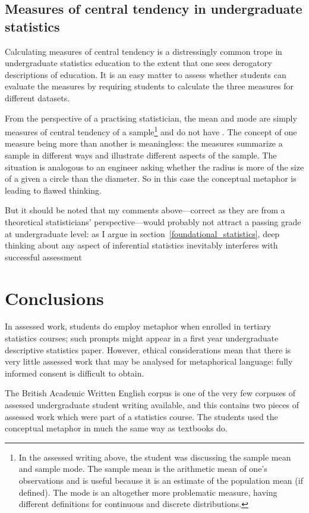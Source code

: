\subsection{Measures of central tendency in undergraduate statistics}

Calculating measures of central tendency is a distressingly common
trope in undergraduate statistics education to the extent that one
sees derogatory descriptions of  education.
It is an easy matter to assess whether students can evaluate the
measures by requiring students to calculate the three measures for
different datasets.

From the perspective of a practising statistician, the mean and mode
are simply measures of central tendency of a sample\footnote{In the
  assessed writing above, the student was discussing the sample mean
  and sample mode.  The sample mean is the arithmetic mean of one's
  observations and is useful because it is an estimate of the
  population mean (if defined).  The mode is an altogether more
  problematic measure, having different definitions for continuous and
  discrete distributions.} and do not have .  The
concept of one measure being more  than
another is meaningless: the measures summarize a sample in different
ways and illustrate different aspects of the sample.  The situation is
analogous to an engineer asking whether the radius is more
 of the size of a given a circle than the
diameter.  So in this case the conceptual metaphor  is leading to flawed thinking.

But it should be noted that my comments above---correct as they are
from a theoretical statisticians' perspective---would probably not
attract a passing grade at undergraduate level: as I argue in
section~\ref{foundational_statistics}, deep thinking about any aspect
of inferential statistics inevitably interferes with successful
assessment

\section{Conclusions}

In assessed work, students do employ metaphor when enrolled in
tertiary statistics courses; such prompts might appear in a first year
undergraduate descriptive statistics paper.  However, ethical
considerations mean that there is very little assessed work that may
be analysed for metaphorical language: fully informed consent is
difficult to obtain.

The British Academic Written English corpus is one of the very few
corpuses of assessed undergraduate student writing available, and this
contains two pieces of assessed work which were part of a statistics
course.  The students used the conceptual metaphor  in much the same way as textbooks do.

